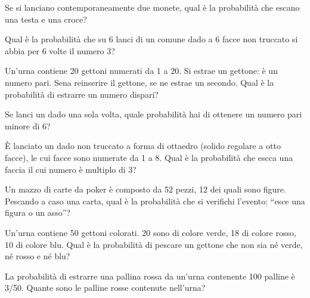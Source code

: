 \begin{esercizio}%
Se si lanciano contemporaneamente due monete, qual è la probabilità che escano 
una testa e una croce?
\end{esercizio}

\begin{esercizio} %
Qual è la probabilità che su 6 lanci di un comune dado a 6 facce non truccato si 
abbia per 6 volte il numero 3?
\end{esercizio}

\begin{esercizio} %
Un'urna contiene 20 gettoni numerati da 1 a 20. Si estrae un gettone: è un 
numero pari. Sena reinserire il gettone, se ne estrae un secondo. Qual è la 
probabilità di estrarre un numero dispari?
\end{esercizio}

\begin{esercizio} %
Se lanci un dado una sola volta, quale probabilità hai di ottenere un numero 
pari minore di 6?
\end{esercizio}

\begin{esercizio} %
È lanciato un dado non truccato a forma di ottaedro (solido regolare a otto 
facce), le cui facce sono numerate da 1 a 8. Qual è la probabilità che escca una 
faccia il cui numero è multiplo di 3?
\end{esercizio}

\begin{esercizio} %
Un mazzo di carte da poker è composto da 52 pezzi, 12 dei quali sono figure. 
Pescando a caso una carta, qual è la probabilità che si verifichi l'evento: 
``esce una figura o un asso''?
\end{esercizio}

\begin{esercizio} %
Un'urna contiene 50 gettoni colorati. 20 sono di colore verde, 18 di colore 
rosso, 10 di colore blu. Qual è la probabilità di pescare un gettone che non sia 
né verde, né rosso e né blu?
\end{esercizio}

\begin{esercizio} %
La probabilità di estrarre una pallina rossa da un'urna contenente 100 palline è 
3/50. Quante sono le palline rosse contenute nell'urna?
\end{esercizio}

